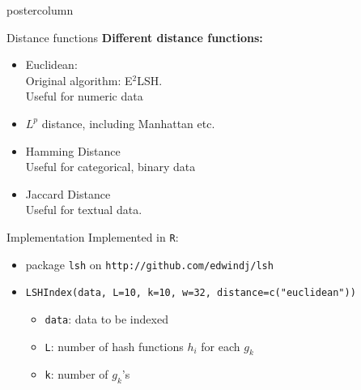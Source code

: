 \documentclass[final,hyperref={pdfpagelabels=false}]{beamer}
\newlength{\columnheight}
\begin{document}
\begin{frame}[fragile]
\begin{columns}
    \begin{column}{.49\textwidth}
      \begin{beamercolorbox}[center,wd=\textwidth]{postercolumn}
        \begin{minipage}[T]{.95\textwidth} %
          \parbox[t][\columnheight]{\textwidth}{ %
            \begin{block}{Distance functions}
            {\bf\Large Different distance functions:}
            \begin{itemize}
             \item Euclidean: \\
             Original algorithm: E$^2$LSH.\\
             Useful for numeric data
             \item $L^p$ distance, including Manhattan etc.
             \item Hamming Distance \\
             Useful for categorical, binary data
             \item Jaccard Distance \\
             Useful for textual data.
            \end{itemize}
            \end{block}
            \vfill
            \begin{block}{Implementation}
              Implemented in {\tt R}:
              \begin{itemize}
                \item package {\tt lsh} on {\tt http://github.com/edwindj/lsh}~\\
                \item {\tt LSHIndex(data, L=10, k=10, w=32, distance=c("euclidean"))} ~\\
                  \begin{itemize}
                    \item {\tt data}: data to be indexed
                    \item {\tt L}: number of hash functions $h_i$ for each $g_k$
                    \item {\tt k}: number of $g_k$'s

\end{itemize}
\end{itemize}
\end{block}}
\end{minipage}
\end{beamercolorbox}
\end{column}
\end{columns}
\end{frame}
\end{document}
